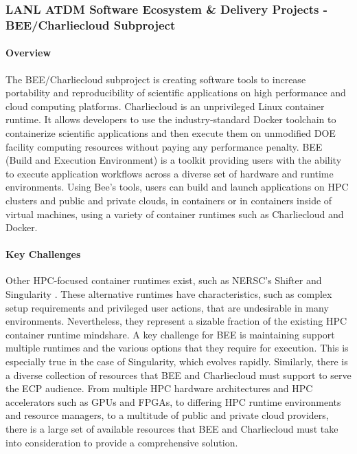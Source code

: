 \subsubsection{LANL ATDM Software Ecosystem \& Delivery Projects - BEE/Charliecloud Subproject} 

\paragraph{Overview}
The BEE/Charliecloud subproject is creating software tools to increase portability
and reproducibility of scientific applications on high performance and cloud
computing platforms.  Charliecloud \cite{priedhorskyrrandlestc2016} is an unprivileged Linux container
runtime.  It allows developers to use the industry-standard Docker
\cite{dockerinc}
toolchain to containerize scientific applications and then execute them on
unmodified DOE facility computing resources without paying any performance
penalty.  BEE \cite{beeproject} (Build and Execution Environment) is a toolkit providing
users with the ability to execute application workflows across a diverse set of
hardware and runtime environments.  Using Bee's tools, users can build and
launch applications on HPC clusters and public and private clouds, in
containers or in containers inside of virtual machines, using a variety of
container runtimes such as Charliecloud and Docker. 

\paragraph{Key Challenges}
Other HPC-focused container runtimes exist, such as NERSC's Shifter
\cite{canonrsjacobsend} and
Singularity \cite{kurtzergmsochatvbauermw}.  These alternative runtimes have characteristics, such as
complex setup requirements and privileged user actions, that are undesirable in
many environments.  Nevertheless, they represent a sizable fraction of the
existing HPC container runtime mindshare.  A key challenge for BEE is
maintaining support multiple runtimes and the various options that they require
for execution.  This is especially true in the case of Singularity, which
evolves rapidly.  Similarly, there is a diverse collection of resources that
BEE and Charliecloud must support to serve the ECP audience.  From multiple HPC
hardware architectures and HPC accelerators such as GPUs and FPGAs, to
differing HPC runtime environments and resource managers, to a multitude of
public and private cloud providers, there is a large set of available resources
that BEE and Charliecloud must take into consideration to provide a
comprehensive solution.

